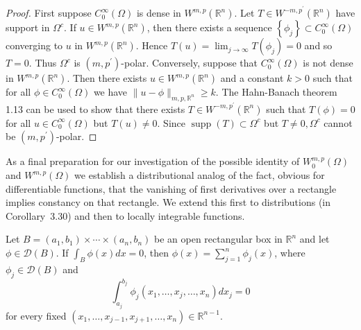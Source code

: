 \begin{proof}
  First suppose $C_0^{\infty}(\Omega)$ is dense in $W^{m, p}\left(\mathbb{R}^n\right)$. Let $T \in W^{-m, p^{\prime}}\left(\mathbb{R}^n\right)$ have support in $\Omega^c$. If $u \in W^{m, p}\left(\mathbb{R}^n\right)$, then there exists a sequence $\left\{\phi_j\right\} \subset C_0^{\infty}(\Omega)$ converging to $u$ in $W^{m, p}\left(\mathbb{R}^n\right)$. Hence $T(u)=\lim _{j \rightarrow \infty} T\left(\phi_j\right)=0$ and so $T=0$. Thus $\Omega^c$ is $\left(m, p^{\prime}\right)$-polar.
  Conversely, suppose that $C_0^{\infty}(\Omega)$ is not dense in $W^{m, p}\left(\mathbb{R}^n\right)$. Then there exists $u \in W^{m, p}\left(\mathbb{R}^n\right)$ and a constant $k>0$ such that for all $\phi \in C_0^{\infty}(\Omega)$ we have $\|u-\phi\|_{m, p, \mathbb{R}^n} \geq k$. The Hahn-Banach theorem 1.13 can be used to show that there exists $T \in W^{-m, p^{\prime}}\left(\mathbb{R}^n\right)$ such that $T(\phi)=0$ for all $u \in C_0^{\infty}(\Omega)$ but $T(u) \neq 0$. Since $\operatorname{supp}(T) \subset \Omega^c$ but $T \neq 0, \Omega^c$ cannot be $\left(m, p^{\prime}\right)$-polar.
\end{proof}

As a final preparation for our investigation of the possible identity of $W_0^{m, p}(\Omega)$ and $W^{m, p}(\Omega)$ we establish a distributional analog of the fact, obvious for differentiable functions, that the vanishing of first derivatives over a rectangle implies constancy on that rectangle. We extend this first to distributions (in Corollary~3.30) and then to locally integrable functions.


\begin{lemma}
  Let $B=\left(a_1, b_1\right) \times \cdots \times\left(a_n, b_n\right)$ be an open rectangular box in $\mathbb{R}^n$ and let $\phi \in \mathscr{D}(B)$. If $\int_B \phi(x) d x=0$, then $\phi(x)=\sum_{j=1}^n \phi_j(x)$, where $\phi_j \in \mathscr{D}(B)$ and
  \begin{equation}\label{eq:3.8}
    \int_{a_j}^{b_j} \phi_j\left(x_1, \ldots, x_j, \ldots, x_n\right) d x_j=0
  \end{equation}
  for every fixed $\left(x_1, \ldots, x_{j-1}, x_{j+1}, \ldots, x_n\right) \in \mathbb{R}^{n-1}$.
\end{lemma}

